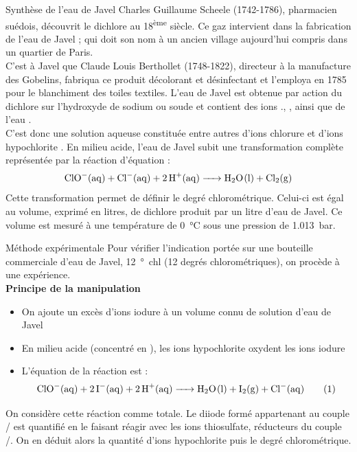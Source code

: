 \documentclass[a4paper,fontsize=10pt,fleqn]{scrartcl}%
\begin{document}
\begin{documentboxenv}{Synthèse de l'eau de Javel}
Charles Guillaume Scheele (1742-1786), pharmacien suédois, découvrit le dichlore au 18\textsuperscript{ème} siècle. Ce gaz intervient dans la fabrication de l'eau de Javel ;  qui doit son nom à un ancien village aujourd'hui compris dans un quartier de Paris.\\
C'est à Javel que Claude Louis Berthollet (1748-1822), directeur à la manufacture des Gobelins, fabriqua ce produit décolorant et désinfectant et l'employa en 1785 pour le blanchiment des toiles textiles. L'eau de Javel est obtenue par action du dichlore  sur l'hydroxyde de sodium ou soude et contient des ions ., ,  ainsi que de l'eau .\\
C'est donc une solution aqueuse constituée entre autres d'ions chlorure et d'ions hypochlorite . En milieu acide, l'eau de Javel subit une transformation complète représentée par la réaction d'équation : $$\ce{ClO-(aq) + Cl-(aq) + 2 H+(aq) -> H2O(l) + Cl2(g)} $$
Cette transformation permet de définir le degré chlorométrique. Celui-ci est égal au volume, exprimé en litres, de dichlore produit par un litre d'eau de Javel. Ce volume est mesuré à une température de \SI{0}{\celsius} sous une pression de \SI{1,013}{\bar}.
\end{documentboxenv}
\begin{documentboxenv}{Méthode expérimentale}
Pour vérifier l'indication portée sur une bouteille commerciale d'eau de Javel, \SI{12}{\degree chl} (12 degrés chlorométriques), on procède à une expérience.\\
\textbf{Principe de la manipulation}
\begin{itemize}
    \item On ajoute un excès d'ions iodure à un volume connu de solution d'eau de Javel
    \item En milieu acide (concentré en ), les ions hypochlorite  oxydent les ions iodure 
    \item L'équation de la réaction est : $$ \ce{ClO-(aq) + 2 I-(aq) + 2H+(aq) -> H2O(l)  + I2(g) + Cl-(aq)} \hspace{2em} (1)$$
\end{itemize}
    On considère cette réaction comme totale. Le diiode formé appartenant au couple / est quantifié en le faisant réagir avec les ions thiosulfate, réducteurs du couple /. On en déduit alors la quantité d'ions hypochlorite puis le degré chlorométrique.
\end{documentboxenv}
\end{document}
